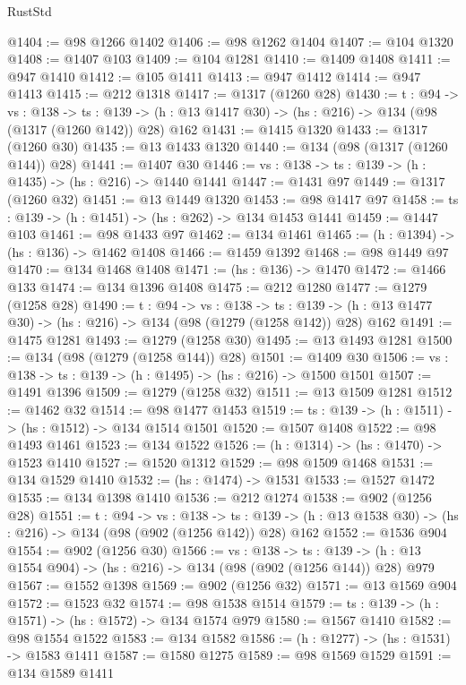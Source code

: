 \begin{lexlean}{RustStd}
\begin{coremodule}
@1404 := @98 @1266 @1402
@1406 := @98 @1262 @1404
@1407 := @104 @1320
@1408 := @1407 @103
@1409 := @104 @1281
@1410 := @1409 @1408
@1411 := @947 @1410
@1412 := @105 @1411
@1413 := @947 @1412
@1414 := @947 @1413
@1415 := @212 @1318
@1417 := @1317 (@1260 @28)
@1430 := {t : @94} ->
  {vs : @138} ->
  {ts : @139} -> (h : @13 @1417 @30) -> (hs : @216) -> @134 (@98 (@1317 (@1260 @142)) @28) @162
@1431 := @1415 @1320
@1433 := @1317 (@1260 @30)
@1435 := @13 @1433 @1320
@1440 := @134 (@98 (@1317 (@1260 @144)) @28)
@1441 := @1407 @30
@1446 := {vs : @138} -> {ts : @139} -> (h : @1435) -> (hs : @216) -> @1440 @1441
@1447 := @1431 @97
@1449 := @1317 (@1260 @32)
@1451 := @13 @1449 @1320
@1453 := @98 @1417 @97
@1458 := {ts : @139} -> (h : @1451) -> (hs : @262) -> @134 @1453 @1441
@1459 := @1447 @103
@1461 := @98 @1433 @97
@1462 := @134 @1461
@1465 := (h : @1394) -> (hs : @136) -> @1462 @1408
@1466 := @1459 @1392
@1468 := @98 @1449 @97
@1470 := @134 @1468 @1408
@1471 := (hs : @136) -> @1470
@1472 := @1466 @133
@1474 := @134 @1396 @1408
@1475 := @212 @1280
@1477 := @1279 (@1258 @28)
@1490 := {t : @94} ->
  {vs : @138} ->
  {ts : @139} -> (h : @13 @1477 @30) -> (hs : @216) -> @134 (@98 (@1279 (@1258 @142)) @28) @162
@1491 := @1475 @1281
@1493 := @1279 (@1258 @30)
@1495 := @13 @1493 @1281
@1500 := @134 (@98 (@1279 (@1258 @144)) @28)
@1501 := @1409 @30
@1506 := {vs : @138} -> {ts : @139} -> (h : @1495) -> (hs : @216) -> @1500 @1501
@1507 := @1491 @1396
@1509 := @1279 (@1258 @32)
@1511 := @13 @1509 @1281
@1512 := @1462 @32
@1514 := @98 @1477 @1453
@1519 := {ts : @139} -> (h : @1511) -> (hs : @1512) -> @134 @1514 @1501
@1520 := @1507 @1408
@1522 := @98 @1493 @1461
@1523 := @134 @1522
@1526 := (h : @1314) -> (hs : @1470) -> @1523 @1410
@1527 := @1520 @1312
@1529 := @98 @1509 @1468
@1531 := @134 @1529 @1410
@1532 := (hs : @1474) -> @1531
@1533 := @1527 @1472
@1535 := @134 @1398 @1410
@1536 := @212 @1274
@1538 := @902 (@1256 @28)
@1551 := {t : @94} ->
  {vs : @138} ->
  {ts : @139} -> (h : @13 @1538 @30) -> (hs : @216) -> @134 (@98 (@902 (@1256 @142)) @28) @162
@1552 := @1536 @904
@1554 := @902 (@1256 @30)
@1566 := {vs : @138} ->
  {ts : @139} -> (h : @13 @1554 @904) -> (hs : @216) -> @134 (@98 (@902 (@1256 @144)) @28) @979
@1567 := @1552 @1398
@1569 := @902 (@1256 @32)
@1571 := @13 @1569 @904
@1572 := @1523 @32
@1574 := @98 @1538 @1514
@1579 := {ts : @139} -> (h : @1571) -> (hs : @1572) -> @134 @1574 @979
@1580 := @1567 @1410
@1582 := @98 @1554 @1522
@1583 := @134 @1582
@1586 := (h : @1277) -> (hs : @1531) -> @1583 @1411
@1587 := @1580 @1275
@1589 := @98 @1569 @1529
@1591 := @134 @1589 @1411

\end{coremodule}
\end{lexlean}
